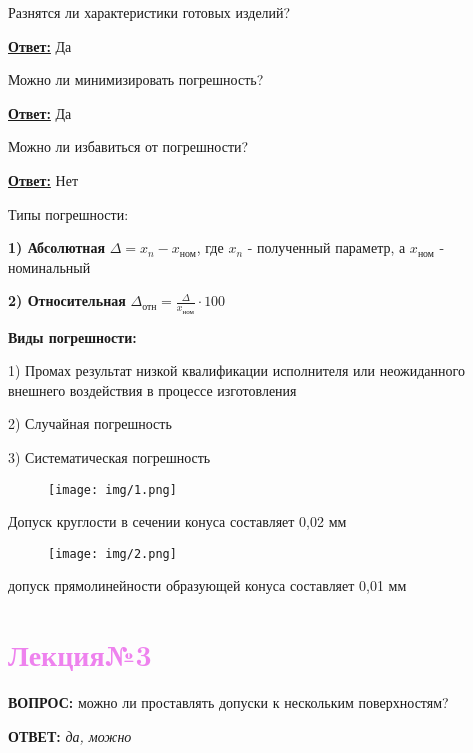 {\begin{center}
\par Разнятся ли характеристики готовых изделий?
\par\underline{\textbf{Ответ:}} Да

\par Можно ли минимизировать погрешность?
\par\underline{\textbf{Ответ:}} Да

\par Можно ли избавиться от погрешности?
\par\underline{\textbf{Ответ:}} Нет

\par Типы погрешности:
\par\textbf{1) Абсолютная} $\Delta = x_{n} - x_\text{ном}$, где $x_{n}$ - полученный параметр, а $x_\text{ном}$ - номинальный
\par\textbf{2) Относительная} $\Delta_\text{отн} = \frac{\Delta}{x_\text{ном}} \cdot 100$
\par\textbf{Виды погрешности:}
\par 1) Промах результат низкой квалификации исполнителя или неожиданного внешнего воздействия в процессе изготовления
\par 2) Случайная погрешность
\par 3) Систематическая погрешность

    \begin{figure}[H]
    \centering\texttt{[image: img/1.png]} 
    \end{figure}
    \par Допуск круглости в сечении конуса составляет 0,02 мм
    
    \begin{figure}[H]
    \centering\texttt{[image: img/2.png]} 
    \end{figure}
    \par допуск прямолинейности образующей конуса составляет 0,01 мм
    
\end{center}
\newpage


\Large\section*{\textcolor{violet}{Лекция№3}}
\begin{center}
    \par \textbf{ВОПРОС:} можно ли проставлять допуски к нескольким поверхностям?
    \par \textbf{ОТВЕТ:} \textit{да, можно}
    

\end{center}}

